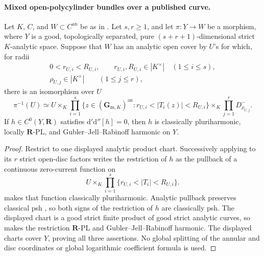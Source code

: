 \paragraph{Mixed open-polycylinder bundles over a published curve.}
\begin{corollary}
\label{cor:p062-mixed-open-polycylinder-bundles-over-curves}
Let \(K\), \(C\), and \(W\subset C^{\mathrm{an}}\) be as in
.  Let \(s,r\geq1\), and let
\(\pi:Y\to W\) be a morphism, where \(Y\) is a good, topologically
separated, pure \((s+r+1)\)-dimensional strict \(K\)-analytic space.
Suppose that \(W\) has an analytic open cover by \(U\)'s for which, for
radii
\[
 \begin{gathered}
 0<r_{U,i}<R_{U,i},\qquad r_{U,i},R_{U,i}\in|K^\times|
       \quad(1\leq i\leq s),\\
 \rho_{U,j}\in|K^\times|\qquad(1\leq j\leq r),
 \end{gathered}
\]
there is an isomorphism over \(U\)
\[
 \pi^{-1}(U)\simeq
 U\times_K\prod_{i=1}^s
 \{z\in(\mathbf G_{\mathrm m,K})^{\mathrm{an}}:
                         r_{U,i}<|T_i(z)|<R_{U,i}\}
 \times_K\prod_{j=1}^rD^-_{\rho_{U,j}}.
\]
If \(h\in C^0(Y,\mathbf R)\) satisfies
\(\mathrm d'\mathrm d''[h]=0\), then \(h\) is classically
pluriharmonic, locally \(\mathbf R\)-PL, and Gubler--Jell--Rabinoff
harmonic on \(Y\).
\end{corollary}

\begin{proof}
Restrict to one displayed analytic product chart.  Successively applying
 to its \(r\) strict open-disc factors
writes the restriction of \(h\) as the pullback of a continuous
zero-current function on
\[
 U\times_K\prod_{i=1}^s
 \{r_{U,i}<|T_i|<R_{U,i}\}.
\]
 makes that function
classically pluriharmonic.  Analytic pullback preserves classical psh
\cite[Proposition~4.2(6)]{GR25Classical}, so both signs of the restriction
of \(h\) are classically psh.  The displayed chart is a good strict finite
product of good strict analytic curves, so
 makes the restriction
\(\mathbf R\)-PL and Gubler--Jell--Rabinoff harmonic.  The displayed charts
cover \(Y\), proving all three assertions.  No global splitting of the
annular and disc coordinates or global logarithmic coefficient formula is
used.
\end{proof}


